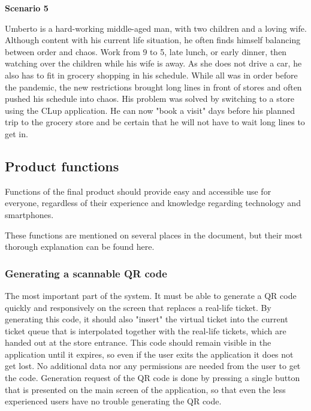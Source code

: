 \textbf{Scenario 5}

\hspace{\parindent}Umberto is a hard-working middle-aged man, with two children and a loving wife. Although content with his current life situation, he often finds himself balancing between order and chaos. Work from 9 to 5, late lunch, or early dinner, then watching over the children while his wife is away. As she does not drive a car, he also has to fit in grocery shopping in his schedule. While all was in order before the pandemic, the new restrictions brought long lines in front of stores and often pushed his schedule into chaos. His problem was solved by switching to a store using the CLup application. He can now "book a visit" days before his planned trip to the grocery store and be certain that he will not have to wait long lines to get in. 

\newpage

\subsection{Product functions}
\hspace{\parindent}Functions of the final product should provide easy and accessible use for everyone, regardless of their experience and knowledge regarding technology and smartphones. 

These functions are mentioned on several places in the document, but their most thorough explanation can be found here.

\subsubsection{Generating a scannable QR code}

\hspace{\parindent}The most important part of the system. It must be able to generate a QR code quickly and responsively on the screen that replaces a real-life ticket. By generating this code, it should also "insert" the virtual ticket into the current ticket queue that is interpolated together with the real-life tickets, which are handed out at the store entrance. This code should remain visible in the application until it expires, so even if the user exits the application it does not get lost. No additional data nor any permissions are needed from the user to get the code. Generation request of the QR code is done by pressing a single button that is presented on the main screen of the application, so that even the less experienced users have no trouble generating the QR code. 
